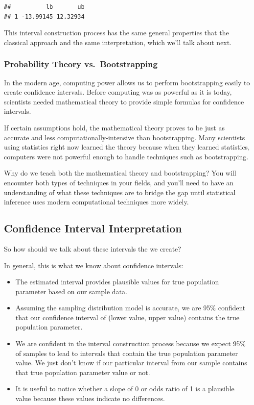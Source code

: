 \documentclass[
]{book}
\providecommand{\tightlist}{%
  \setlength{\itemsep}{0pt}\setlength{\parskip}{0pt}}
\begin{document}
\begin{verbatim}
##          lb       ub
## 1 -13.99145 12.32934
\end{verbatim}

This interval construction process has the same general properties that the classical approach and the same interpretation, which we'll talk about next.

\hypertarget{probability-theory-vs.-bootstrapping}{%
\subsubsection{Probability Theory vs.~Bootstrapping}\label{probability-theory-vs.-bootstrapping}}

In the modern age, computing power allows us to perform bootstrapping easily to create confidence intervals. Before computing was as powerful as it is today, scientists needed mathematical theory to provide simple formulas for confidence intervals.

If certain assumptions hold, the mathematical theory proves to be just as accurate and less computationally-intensive than bootstrapping. Many scientists using statistics right now learned the theory because when they learned statistics, computers were not powerful enough to handle techniques such as bootstrapping.

Why do we teach both the mathematical theory and bootstrapping? You will encounter both types of techniques in your fields, and you'll need to have an understanding of what these techniques are to bridge the gap until statistical inference uses modern computational techniques more widely.

\hypertarget{confidence-interval-interpretation}{%
\subsection{Confidence Interval Interpretation}\label{confidence-interval-interpretation}}

So how should we talk about these intervals the we create?

In general, this is what we know about confidence intervals:

\begin{itemize}
\tightlist
\item
  The estimated interval provides plausible values for true population parameter based on our sample data.
\item
  Assuming the sampling distribution model is accurate, we are 95\% confident that our confidence interval of (lower value, upper value) contains the true population parameter.
\item
  We are confident in the interval construction process because we expect 95\% of samples to lead to intervals that contain the true population parameter value. We just don't know if our particular interval from our sample contains that true population parameter value or not.
\item
  It is useful to notice whether a slope of 0 or odds ratio of 1 is a plausible value because these values indicate no differences.
\end{itemize}
\end{document}
